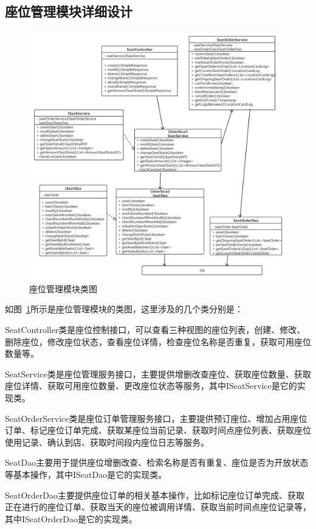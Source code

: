 \subsection{座位管理模块详细设计}
\begin{figure}[htbp!]
    \centering
    \includegraphics[width=\linewidth]{FIGs/chapter4/seat.pdf}
    \caption{座位管理模块类图}\label{fig_seat}
\end{figure}

如图~\ref{fig_seat}所示是座位管理模块的类图，这里涉及的几个类分别是：

SeatController类是座位控制接口，可以查看三种视图的座位列表，创建、修改、删除座位，修改座位状态，查看座位详情，检查座位名称是否重复，获取可用座位数量等。

SeatService类是座位管理服务接口，主要提供增删改查座位、获取座位数量、获取座位详情、获取可用座位数量、更改座位状态等服务，其中ISeatService是它的实现类。

SeatOrderService类是座位订单管理服务接口，主要提供预订座位、增加占用座位订单、标记座位订单完成、获取某座位当前记录、获取时间点座位列表、获取座位使用记录、确认到店、获取时间段内座位日志等服务。

SeatDao主要用于提供座位增删改查、检索名称是否有重复、座位是否为开放状态等基本操作，其中ISeatDao是它的实现类。

SeatOrderDao主要提供座位订单的相关基本操作，比如标记座位订单完成、获取正在进行的座位订单、获取当天的座位被调用详情、获取当前时间点座位记录等，其中ISeatOrderDao是它的实现类。\\

